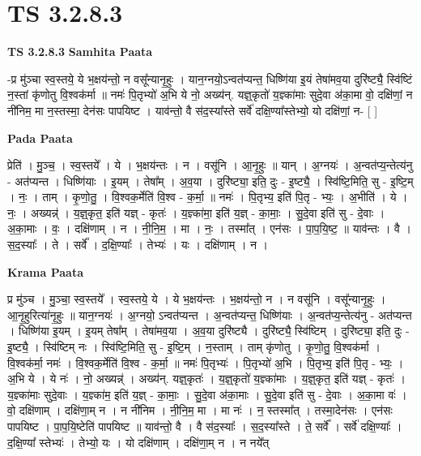 \documentclass[17pt]{extarticle}
\begin{document}

\section{ TS 3.2.8.3 }

\textbf{TS 3.2.8.3 } \newline
\textbf{Samhita Paata} \newline

-प्र मु॑ञ्चा स्व॒स्तये॒ ये भ॒क्षय॑न्तो॒ न वसू᳚न्यानृ॒हुः । यान॒ग्नयो॒ऽन्वत॑प्यन्त॒ धिष्णि॑या इ॒यं तेषा॑मव॒या दुरि॑ष्ट्यै॒ स्वि॑ष्टिं न॒स्तां कृ॑णोतु वि॒श्वक॑र्मा ॥ नमः॑ पि॒तृभ्यो॑ अ॒भि ये नो॒ अख्य॑न्. यज्ञ्॒कृतो॑ य॒ज्ञ्का॑माः सुदे॒वा अ॑का॒मा वो॒ दक्षि॑णां॒ न नी॑निम॒ मा न॒स्तस्मा॒ देन॑सः पापयिष्ट । याव॑न्तो॒ वै स॑द॒स्या᳚स्ते सर्वे॑ दक्षि॒ण्या᳚स्तेभ्यो॒ यो दक्षि॑णां॒ न-  [  ] \newline

\textbf{Pada Paata} \newline

प्रेति॑ । मु॒ञ्च॒ । स्व॒स्तये᳚ । ये । भ॒क्षय॑न्तः । न । वसू॑नि । आ॒नृ॒हुः ॥ यान् । अ॒ग्नयः॑ । अ॒न्वत॑प्य॒न्तेत्य॑नु - अत॑प्यन्त । धिष्णि॑याः । इ॒यम् । तेषा᳚म् । अ॒व॒या । दुरि॑ष्ट्या॒ इति॒ दुः - इ॒ष्ट्यै॒ । स्वि॑ष्टि॒मिति॒ सु - इ॒ष्टि॒म् । नः॒ । ताम् । कृ॒णो॒तु॒ । वि॒श्वक॒र्मेति॑ वि॒श्व - क॒र्मा॒ ॥ नमः॑ । पि॒तृभ्य॒ इति॑ पि॒तृ - भ्यः॒ । अ॒भीति॑ । ये । नः॒ । अख्यन्न्॑ । य॒ज्ञ्॒कृत॒ इति॑ यज्ञ् - कृतः॑ । य॒ज्ञ्का॑मा॒ इति॑ य॒ज्ञ् - का॒माः॒ । सु॒दे॒वा इति॑ सु - दे॒वाः । अ॒का॒माः । वः॒ । दक्षि॑णाम् । न । नी॒नि॒म॒ । मा । नः॒ । तस्मा᳚त् । एन॑सः । पा॒प॒यि॒ष्ट॒ ॥ याव॑न्तः । वै । स॒द॒स्याः᳚ । ते । सर्वे᳚ । द॒क्षि॒ण्याः᳚ । तेभ्यः॑ । यः । दक्षि॑णाम् । न ।  \newline


\textbf{Krama Paata} \newline

प्र मु॑ञ्च । मु॒ञ्चा॒ स्व॒स्तये᳚ । स्व॒स्तये॒ ये । ये भ॒क्षय॑न्तः । भ॒क्षय॑न्तो॒ न । न वसू॑नि । वसू᳚न्यानृ॒हुः । आ॒नृ॒हुरित्या॑नृ॒हुः ॥ यान॒ग्नयः॑ । अ॒ग्नयो॒ ऽन्वत॑प्यन्त । अ॒न्वत॑प्यन्त॒ धिष्णि॑याः । अ॒न्वत॑प्य॒न्तेत्य॑नु - अत॑प्यन्त । धिष्णि॑या इ॒यम् । इ॒यम् तेषा᳚म् । तेषा॑मव॒या । अ॒व॒या दुरि॑ष्ट्यै । दुरि॑ष्ट्यै॒ स्वि॑ष्टिम् । दुरि॑ष्ट्या॒ इति॒ दुः - इ॒ष्ट्यै॒ । स्वि॑ष्टिम् नः । स्वि॑ष्टि॒मिति॒ सु - इ॒ष्टि॒म् । न॒स्ताम् । ताम् कृ॑णोतु । कृ॒णो॒तु॒ वि॒श्वक॑र्मा । वि॒श्वक॑र्मा॒ नमः॑ । वि॒श्वक॒र्मेति॑ वि॒श्व - क॒र्मा॒ ॥ नमः॑ पि॒तृभ्यः॑ । पि॒तृभ्यो॑ अ॒भि । पि॒तृभ्य॒ इति॑ पि॒तृ - भ्यः॒ । अ॒भि ये । ये नः॑ । नो॒ अख्यन्न्॑ । अख्य॑न्. यज्ञ्॒कृतः॑ । य॒ज्ञ्॒कृतो॑ य॒ज्ञ्का॑माः । य॒ज्ञ्॒कृत॒ इति॑ यज्ञ् - कृतः॑ । य॒ज्ञ्का॑माः सुदे॒वाः । य॒ज्ञ्का॑म॒ इति॑ य॒ज्ञ् - का॒माः॒ । सु॒दे॒वा अ॑का॒माः । सु॒दे॒वा इति॑ सु - दे॒वाः । अ॒का॒मा वः॑ । वो॒ दक्षि॑णाम् । दक्षि॑णा॒म् न । न नी॑निम । नी॒नि॒म॒ मा । मा नः॑ । न॒ स्तस्मा᳚त् । तस्मा॒देन॑सः । एन॑सः पापयिष्ट । पा॒प॒यि॒ष्टेति॑ पापयिष्ट ॥ याव॑न्तो॒ वै । वै स॑द॒स्याः᳚ । स॒द॒स्या᳚स्ते । ते॒ सर्वे᳚ । सर्वे॑ दक्षि॒ण्याः᳚ । द॒क्षि॒ण्या᳚ स्तेभ्यः॑ । तेभ्यो॒ यः । यो दक्षि॑णाम् । दक्षि॑णा॒म् न । न नये᳚त् \newline
\end{document}
